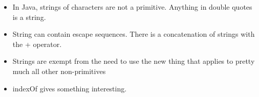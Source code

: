 \documentclass[11pt]{article}
\begin{document}
\begin{itemize}
	\item In Java, strings of characters are not a primitive.  Anything in 
		double quotes is a string.  
	\item String can contain escape sequences.  There is a concatenation of 
		strings with the + operator.
	\item Strings are exempt from the need to use the new thing that applies 
		to pretty much all other non-primitives
	\item indexOf gives something interesting.
	\end{itemize}
\end{document}
